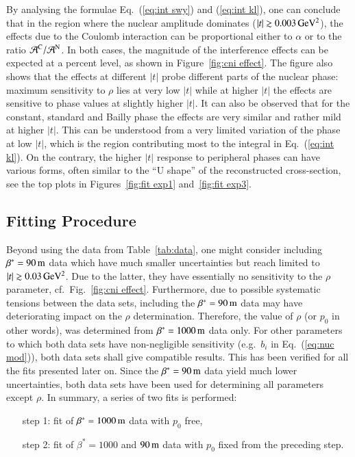 By analysing the formulae Eq.~(\ref{eq:int swy}) and (\ref{eq:int kl}), one can conclude that in the region where the nuclear amplitude dominates ($|t| \gtrsim 0.003\,{\rm GeV^2}$), the effects due to the Coulomb interaction can be proportional either to $\alpha$ or to the ratio ${\cal A}^{\rm C} / {\cal A}^{\rm N}$. In both cases, the magnitude of the interference effects can be expected at a percent level, as shown in Figure~\ref{fig:cni effect}. The figure also shows that the effects at different $|t|$ probe different parts of the nuclear phase: maximum sensitivity to $\rho$ lies at very low $|t|$ while at higher $|t|$ the effects are sensitive to phase values at slightly higher $|t|$. It can also be observed that for the constant, standard and Bailly phase the effects are very similar and rather mild at higher $|t|$. This can be understood from a very limited variation of the phase at low $|t|$, which is the region contributing most to the integral in Eq.~(\ref{eq:int kl}). On the contrary, the higher $|t|$ response to peripheral phases can have various forms, often similar to the ``U shape'' of the reconstructed cross-section, see the top plots in Figures~\ref{fig:fit exp1} and~\ref{fig:fit exp3}.


\subsection{Fitting Procedure}
\label{sec:fit procedure}

Beyond using the data from Table~\ref{tab:data}, one might consider including $\beta^* = 90\,{\rm m}$ data \cite{8tev-90m} which have much smaller uncertainties but reach limited to $|t| \gtrsim 0.03\,{\rm GeV^2}$. Due to the latter, they have essentially no sensitivity to the $\rho$ parameter, cf.~Fig.~\ref{fig:cni effect}. Furthermore, due to possible systematic tensions between the data sets, including the $\beta^* = 90\,{\rm m}$ data may have deteriorating impact on the $\rho$ determination. Therefore, the value of $\rho$ (or $p_0$ in other words), was determined from $\beta^* = 1000\,{\rm m}$ data only. For other parameters to which both data sets have non-negligible sensitivity (e.g.~$b_i$ in Eq.~(\ref{eq:nuc mod})), both data sets shall give compatible results. This has been verified for all the fits presented later on. Since the $\beta^* = 90\,{\rm m}$ data yield much lower uncertainties, both data sets have been used for determining all parameters except $\rho$. In summary, a series of two fits is performed:
\begin{enumerate}[leftmargin=2cm]
\item[step 1:] fit of $\beta^* = 1000\,{\rm m}$ data with $p_0$ free,
\item[step 2:] fit of $\beta^* = 1000$ and $90\,{\rm m}$ data with $p_0$ fixed from the preceding step.
\end{enumerate}

